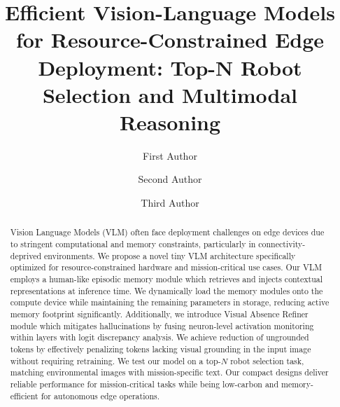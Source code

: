 \documentclass[runningheads]{llncs}
\begin{document}
\raggedbottom

\title{Efficient Vision-Language Models for Resource-Constrained Edge Deployment: Top-N Robot Selection and Multimodal Reasoning} 


\author{First Author \and
Second Author \and
Third Author}



\maketitle

\begin{abstract}
  Vision Language Models (VLM) often face deployment challenges on edge devices due to stringent computational and memory constraints, particularly in connectivity-deprived environments. We propose a novel tiny VLM architecture specifically optimized for resource-constrained hardware and mission-critical use cases. Our VLM employs a human-like episodic memory module which retrieves and injects contextual representations at inference time. We dynamically load the memory modules onto the compute device while maintaining the remaining parameters in storage, reducing active memory footprint significantly. Additionally, we introduce Visual Absence Refiner module which mitigates hallucinations by fusing neuron-level activation monitoring within layers with logit discrepancy analysis. We achieve reduction of ungrounded tokens by effectively penalizing tokens lacking visual grounding in the input image without requiring retraining. We test our model on a top-$N$ robot selection task, matching environmental images with mission-specific text. Our compact designs deliver reliable performance for mission-critical tasks while being low-carbon and memory-efficient for autonomous edge operations.

\end{abstract}
\end{document}
